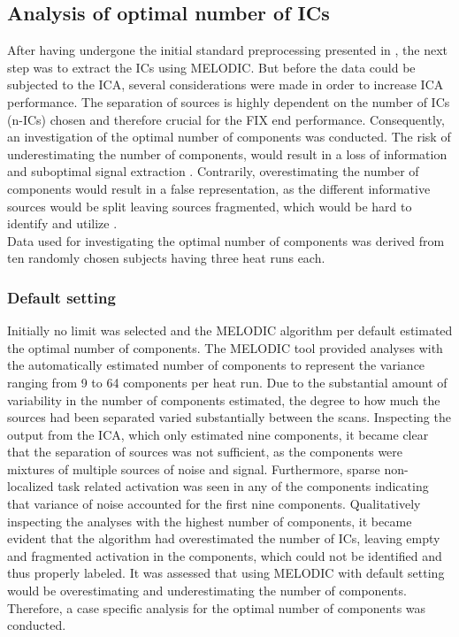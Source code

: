 
\subsection{Analysis of optimal number of ICs} \label{sec:optimal}

After having undergone the initial standard preprocessing presented in , the next step was to extract the ICs using MELODIC. But before the data could be subjected to the ICA, several considerations were made in order to increase ICA performance. The separation of sources is highly dependent on the number of ICs (n-ICs) chosen and therefore crucial for the FIX end performance. Consequently, an investigation of the optimal number of components was conducted. The risk of underestimating the number of components, would result in a loss of information and suboptimal signal extraction \cite{Beckmann2004}. Contrarily, overestimating the number of components would result in a false representation, as the different informative sources would be split leaving sources fragmented, which would be hard to identify and utilize \cite{Beckmann2004,Li2007}. \\
Data used for investigating the optimal number of components was derived from ten randomly chosen subjects having three heat runs each. 


\subsubsection{Default setting}
Initially no limit was selected and the MELODIC algorithm per default estimated the optimal number of components. \cite{FMRIB2016} The MELODIC tool provided analyses with the automatically estimated number of components to represent the variance ranging from 9 to 64 components per heat run. Due to the substantial amount of variability in the number of components estimated, the degree to how much the sources had been separated varied substantially between the scans. Inspecting the output from the ICA, which only estimated nine components, it became clear that the separation of sources was not sufficient, as the components were mixtures of multiple sources of noise and signal. Furthermore, sparse non-localized task related activation was seen in any of the components indicating that variance of noise accounted for the first nine components. Qualitatively inspecting the analyses with the highest number of components, it became evident that the algorithm had overestimated the number of ICs, leaving empty and fragmented activation in the components, which could not be identified and thus properly labeled. It was assessed that using MELODIC with default setting would be overestimating and underestimating the number of components. Therefore, a case specific analysis for the optimal number of components was conducted. 

